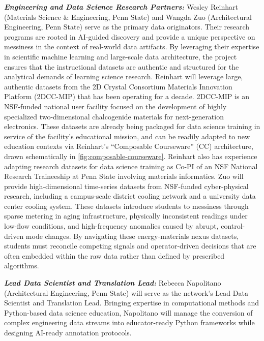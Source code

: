 \documentclass[11pt]{article}
\begin{document}

\textit{\textbf{Engineering and Data Science Research Partners:}} 
Wesley Reinhart (Materials Science \& Engineering, Penn State) and Wangda Zuo (Architectural Engineering, Penn State) serve as the primary data originators.
Their research programs are rooted in AI-guided discovery and provide a unique perspective on messiness in the context of real-world data artifacts.
By leveraging their expertise in scientific machine learning and large-scale data architecture, the project ensures that the instructional datasets are authentic and structured for the analytical demands of learning science research.
Reinhart will leverage large, authentic datasets from the 2D Crystal Consortium Materials Innovation Platform (2DCC-MIP) that has been operating for a decade.
2DCC-MIP is an NSF-funded national user facility focused on the development of highly specialized two-dimensional chalcogenide materials for next-generation electronics.
These datasets are already being packaged for data science training in service of the facility's educational mission, and can be readily adapted to new education contexts via Reinhart's ``Composable Courseware'' (CC) architecture, drawn schematically in \autoref{fig:composable-courseware}.
Reinhart also has experience adapting research datasets for data science training as Co-PI of an NSF National Research Traineeship at Penn State involving materials informatics.
Zuo will provide high-dimensional time-series datasets from NSF-funded cyber-physical research, including a campus-scale district cooling network and a university data center cooling system. 
These datasets introduce students to messiness through sparse metering in aging infrastructure, physically inconsistent readings under low-flow conditions, and high-frequency anomalies caused by abrupt, control-driven mode changes. 
By navigating these energy-materials nexus datasets, students must reconcile competing signals and operator-driven decisions that are often embedded within the raw data rather than defined by prescribed algorithms.

\textit{\textbf{Lead Data Scientist and Translation Lead:}}
Rebecca Napolitano (Architectural Engineering, Penn State) will serve as the network's Lead Data Scientist and Translation Lead.
Bringing expertise in computational methods and Python-based data science education, Napolitano will manage the conversion of complex engineering data streams into educator-ready Python frameworks while designing AI-ready annotation protocols.
\end{document}
